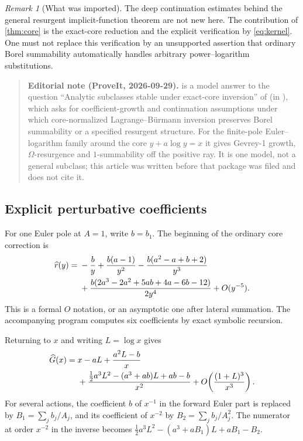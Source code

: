 \documentclass[11pt,a4paper]{article}
\numberwithin{equation}{section}
\theoremstyle{definition}
\theoremstyle{remark}
\newtheorem{remark}[theorem]{Remark}
\begin{document}
\begin{remark}[What was imported]
The deep continuation estimates behind the general resurgent implicit-function theorem are not new here. The contribution of \cref{thm:core} is the exact-core reduction and the explicit verification by \eqref{eq:kernel}. One must not replace this verification by an unsupported assertion that ordinary Borel summability automatically handles arbitrary power--logarithm substitutions.
\end{remark}

\begin{quote}\small\textbf{Editorial note (ProveIt, 2026-09-29).}  is a model answer to the question ``Analytic subclasses stable under exact-core inversion'' of  (in ), which asks for coefficient-growth and continuation assumptions under which core-normalized Lagrange--B\"urmann inversion preserves Borel summability or a specified resurgent structure. For the finite-pole Euler--logarithm family around the core $y+a\log y=x$ it gives Gevrey-1 growth, $\Omega$-resurgence and $1$-summability off the positive ray. It is one model, not a general subclass; this article was written before that package was filed and does not cite it.\end{quote}

\subsection{Explicit perturbative coefficients}
For one Euler pole at $A=1$, write $b=b_1$. The beginning of the ordinary core correction is
\begin{align}
 \widehat r(y)={}&-\frac{b}{y}+\frac{b(a-1)}{y^2}
 -\frac{b(a^2-a+b+2)}{y^3}\notag\\
 &+\frac{b(2a^3-2a^2+5ab+4a-6b-12)}{2y^4}
 +O(y^{-5}).
 \label{eq:core-coefficients}
\end{align}
This is a formal $O$ notation, or an asymptotic one after lateral summation. The accompanying program computes six coefficients by exact symbolic recursion.

Returning to $x$ and writing $L=\log x$ gives
\begin{align}
 \widehat G(x)={}&x-aL+\frac{a^2L-b}{x}\notag\\
 &+\frac{\frac12a^3L^2-(a^3+ab)L+ab-b}{x^2}
 +O\!\left(\frac{(1+L)^3}{x^3}\right).
 \label{eq:polylog-coefficients}
\end{align}
For several actions, the coefficient $b$ of $x^{-1}$ in the forward Euler part is replaced by $B_1=\sum_jb_j/A_j$, and its coefficient of $x^{-2}$ by $B_2=\sum_jb_j/A_j^2$. The numerator at order $x^{-2}$ in the inverse becomes
$\frac12a^3L^2-(a^3+aB_1)L+aB_1-B_2$.
\end{document}

